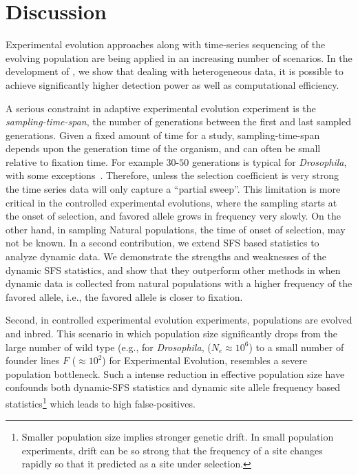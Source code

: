 \section{Discussion}
Experimental
evolution approaches along with time-series sequencing of the evolving
population are being applied in an increasing number of scenarios. In
the development of \comale, we show that dealing with heterogeneous data, it is 
possible to achieve significantly higher detection power as well as 
computational efficiency.


A serious constraint in
adaptive experimental evolution experiment is the
\emph{sampling-time-span}, the number of generations between the first
and last sampled generations. Given a fixed amount of time for a
study, sampling-time-span depends upon the generation time of the
organism, and can often be small relative to fixation time. For
example $30$-$50$ generations is typical for \emph{Drosophila}, with
some exceptions~\cite{zhou2011experimental}.  Therefore, unless the
selection coefficient is very strong the time series data will only
capture a ``partial sweep''.  This limitation is more critical in the
controlled experimental evolutions, where the sampling starts at the
onset of selection, and favored allele grows in frequency very slowly.
On the other hand, in sampling Natural populations, the time of onset
of selection, may not be known. In a second contribution, we extend
SFS based statistics to analyze dynamic data. We demonstrate the
strengths and weaknesses of the dynamic SFS statistics, and show that
they outperform other methods in when dynamic data is collected from
natural populations with a higher frequency of the favored allele,
i.e., the favored allele is closer to fixation.

Second,
in controlled experimental evolution experiments, populations are
evolved and inbred. This scenario in which population size
significantly drops from the large number of wild type (e.g., for
\emph{Drosophila}, ($N_e\approx10^6$) to a small number of founder
lines $F$ ($\approx 10^2$) for Experimental Evolution, resembles a
severe population bottleneck. Such a intense reduction in effective
population size have confounds both dynamic-SFS statistics and dynamic
site allele frequency based statistics\footnote{Smaller population
	size implies stronger genetic drift. In small population
	experiments, drift can be so strong that the frequency of a site
	changes rapidly so that it predicted as a site under selection.}
which leads to high false-positives.


